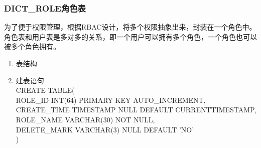 \subsubsection{DICT\_ROLE角色表}
为了便于权限管理，根据RBAC设计，将多个权限抽象出来，封装在一个角色中。角色表和用户表是多对多的关系，即一个用户可以拥有多个角色，一个角色也可以被多个角色拥有。
\begin{enumerate}
    \item 表结构
    \begin{table}[htbp]
        \centering
        \end{table}
    \item 建表语句\\
        CREATE TABLE(\\
            ROLE\_ID INT(64) PRIMARY KEY AUTO\_INCREMENT,\\
            CREATE\_TIME TIMESTAMP NULL DEFAULT CURRENTTIMESTAMP,\\
            ROLE\_NAME VARCHAR(30) NOT NULL,\\
            DELETE\_MARK VARCHAR(3) NULL DEFAULT 'NO'\\
        )
    \end{enumerate}

